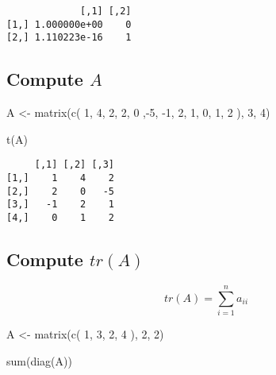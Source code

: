 \documentclass[
  letterpaper,
  DIV=11,
  numbers=noendperiod]{scrartcl}
\newenvironment{Shaded}{\begin{snugshade}}{\end{snugshade}}
\newcommand{\DecValTok}[1]{\textcolor[rgb]{0.68,0.00,0.00}{#1}}
\newcommand{\FunctionTok}[1]{\textcolor[rgb]{0.28,0.35,0.67}{#1}}
\newcommand{\NormalTok}[1]{\textcolor[rgb]{0.00,0.23,0.31}{#1}}
\newcommand{\OtherTok}[1]{\textcolor[rgb]{0.00,0.23,0.31}{#1}}
\newcommand{\SpecialCharTok}[1]{\textcolor[rgb]{0.37,0.37,0.37}{#1}}
\begin{document}
\begin{verbatim}
             [,1] [,2]
[1,] 1.000000e+00    0
[2,] 1.110223e-16    1
\end{verbatim}

\hypertarget{compute-a}{%
\subsection{\texorpdfstring{Compute \(A\)}{Compute A}}\label{compute-a}}

\begin{Shaded}
\begin{Highlighting}[]
\NormalTok{A }\OtherTok{\textless{}{-}} \FunctionTok{matrix}\NormalTok{(}\FunctionTok{c}\NormalTok{(}
  \DecValTok{1}\NormalTok{, }\DecValTok{4}\NormalTok{, }\DecValTok{2}\NormalTok{,}
  \DecValTok{2}\NormalTok{, }\DecValTok{0}\NormalTok{ ,}\SpecialCharTok{{-}}\DecValTok{5}\NormalTok{,}
  \SpecialCharTok{{-}}\DecValTok{1}\NormalTok{, }\DecValTok{2}\NormalTok{, }\DecValTok{1}\NormalTok{,}
  \DecValTok{0}\NormalTok{, }\DecValTok{1}\NormalTok{, }\DecValTok{2}
\NormalTok{), }\DecValTok{3}\NormalTok{, }\DecValTok{4}\NormalTok{)}

\FunctionTok{t}\NormalTok{(A)}
\end{Highlighting}
\end{Shaded}

\begin{verbatim}
     [,1] [,2] [,3]
[1,]    1    4    2
[2,]    2    0   -5
[3,]   -1    2    1
[4,]    0    1    2
\end{verbatim}

\hypertarget{compute-tra}{%
\subsection{\texorpdfstring{Compute
\(tr(A)\)}{Compute tr(A)}}\label{compute-tra}}

\[
tr(A)=\sum_{i=1}^n a_{ii}
\]

\begin{Shaded}
\begin{Highlighting}[]
\NormalTok{A }\OtherTok{\textless{}{-}} \FunctionTok{matrix}\NormalTok{(}\FunctionTok{c}\NormalTok{(}
  \DecValTok{1}\NormalTok{, }\DecValTok{3}\NormalTok{,}
  \DecValTok{2}\NormalTok{, }\DecValTok{4}
\NormalTok{), }\DecValTok{2}\NormalTok{, }\DecValTok{2}\NormalTok{) }

\FunctionTok{sum}\NormalTok{(}\FunctionTok{diag}\NormalTok{(A))}
\end{Highlighting}
\end{Shaded}
\end{document}
